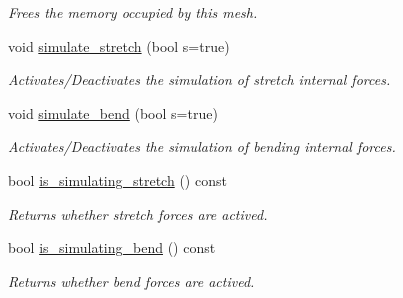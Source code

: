 \begin{DoxyCompactItemize}
\begin{DoxyCompactList}\small\item\em Frees the memory occupied by this mesh. \end{DoxyCompactList}\item 
void \hyperlink{classphysim_1_1meshes_1_1mesh1d_a7601dc6b7a0b59738bdf89c806fbd4ef}{simulate\+\_\+stretch} (bool s=true)
\begin{DoxyCompactList}\small\item\em Activates/\+Deactivates the simulation of stretch internal forces. \end{DoxyCompactList}\item 
void \hyperlink{classphysim_1_1meshes_1_1mesh1d_aaea453fcd1f5f41b6674da822bf53b2f}{simulate\+\_\+bend} (bool s=true)
\begin{DoxyCompactList}\small\item\em Activates/\+Deactivates the simulation of bending internal forces. \end{DoxyCompactList}\item 
bool \hyperlink{classphysim_1_1meshes_1_1mesh1d_acf2d9d0399ecbb4bdf3b521d94342258}{is\+\_\+simulating\+\_\+stretch} () const
\begin{DoxyCompactList}\small\item\em Returns whether stretch forces are actived. \end{DoxyCompactList}\item 
bool \hyperlink{classphysim_1_1meshes_1_1mesh1d_a9cd71d3d05385e30b5e7e330e5f5fb0e}{is\+\_\+simulating\+\_\+bend} () const
\begin{DoxyCompactList}\small\item\em Returns whether bend forces are actived. \end{DoxyCompactList}\end{DoxyCompactItemize}
